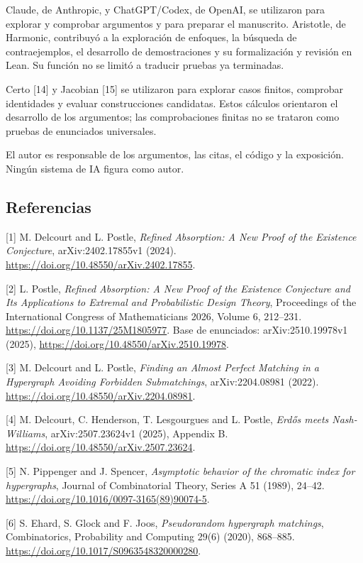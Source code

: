 \documentclass[spanish,11pt,a4paper]{article}
\begin{document}
Claude, de Anthropic, y ChatGPT/Codex, de OpenAI, se utilizaron para explorar y comprobar argumentos y para preparar el manuscrito. Aristotle, de Harmonic, contribuyó a la exploración de enfoques, la búsqueda de contraejemplos, el desarrollo de demostraciones y su formalización y revisión en Lean. Su función no se limitó a traducir pruebas ya terminadas.

Certo {[}14{]} y Jacobian {[}15{]} se utilizaron para explorar casos finitos, comprobar identidades y evaluar construcciones candidatas. Estos cálculos orientaron el desarrollo de los argumentos; las comprobaciones finitas no se trataron como pruebas de enunciados universales.

El autor es responsable de los argumentos, las citas, el código y la exposición. Ningún sistema de IA figura como autor.

\subsection{Referencias}\label{referencias}

\begingroup\small\raggedright
\setlength{\parskip}{0pt}

{[}1{]} M. Delcourt and L. Postle, \emph{Refined Absorption: A New Proof of the Existence Conjecture}, arXiv:2402.17855v1 (2024). \url{https://doi.org/10.48550/arXiv.2402.17855}.

{[}2{]} L. Postle, \emph{Refined Absorption: A New Proof of the Existence Conjecture and Its Applications to Extremal and Probabilistic Design Theory}, Proceedings of the International Congress of Mathematicians 2026, Volume 6, 212--231. \url{https://doi.org/10.1137/25M1805977}. Base de enunciados: arXiv:2510.19978v1 (2025), \url{https://doi.org/10.48550/arXiv.2510.19978}.

{[}3{]} M. Delcourt and L. Postle, \emph{Finding an Almost Perfect Matching in a Hypergraph Avoiding Forbidden Submatchings}, arXiv:2204.08981 (2022). \url{https://doi.org/10.48550/arXiv.2204.08981}.

{[}4{]} M. Delcourt, C. Henderson, T. Lesgourgues and L. Postle, \emph{Erdős meets Nash-Williams}, arXiv:2507.23624v1 (2025), Appendix B. \url{https://doi.org/10.48550/arXiv.2507.23624}.

{[}5{]} N. Pippenger and J. Spencer, \emph{Asymptotic behavior of the chromatic index for hypergraphs}, Journal of Combinatorial Theory, Series A 51 (1989), 24--42. \url{https://doi.org/10.1016/0097-3165(89)90074-5}.

{[}6{]} S. Ehard, S. Glock and F. Joos, \emph{Pseudorandom hypergraph matchings}, Combinatorics, Probability and Computing 29(6) (2020), 868--885. \url{https://doi.org/10.1017/S0963548320000280}.
\end{document}
